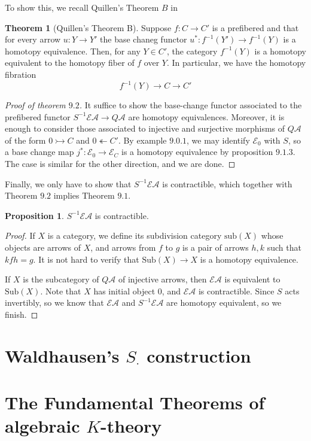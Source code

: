 \documentclass{article}
\theoremstyle{definition}
\newtheorem{theorem}{Theorem}[section]
\theoremstyle{definition}
\theoremstyle{definition}
\theoremstyle{definition}
\newtheorem{proposition}{Proposition}[theorem]
\theoremstyle{definition}
\theoremstyle{definition}
\theoremstyle{definition}
\begin{document}
To show this, we recall Quillen's Theorem $B$ in \cite{Quillen}


\begin{tcolorbox}[colback=red!5!white,colframe=red!30!white]
\begin{theorem}[Quillen's Theorem B]
Suppose $f: C\to C'$ is a prefibered and that for every arrow $u: Y\to Y'$ the base chaneg functor $u^*: f^{-1}(Y')\to f^{-1}(Y)$ is a homotopy equivalence. Then, for any $Y\in C'$, the category $f^{-1}(Y)$ is a homotopy equivalent to the homotopy fiber of $f$ over $Y$. In particular, we have the homotopy fibration
\[f^{-1}(Y)\to C\to C'\]
\end{theorem}
\end{tcolorbox}
\begin{proof}[Proof of theorem $9.2$]
    It suffice to show the base-change functor associated to the prefibered functor $S^{-1}\mathcal{E}\mathcal{A}\to Q \mathcal{A}$ are homotopy equivalences. Moreover, it is enough to consider those associated to injective and surjective morphisms of $Q \mathcal{A}$ of the form $0\rightarrowtail C$ and $0\twoheadleftarrow C'$. By example $9.0.1$, we may identify $\mathcal{E}_0$ with $S$, so a base change map $j^*: \mathcal{E}_0\to \mathcal{E}_C$ is a homotopy equivalence by proposition $9.1.3$. The case is similar for the other direction, and we are done.
\end{proof}

Finally, we only have to show that $S^{-1}\mathcal{E}\mathcal{A}$ is contractible, which together with Theorem $9.2$ implies Theorem $9.1$. 


\begin{tcolorbox}[colback=blue!5!white,colframe=blue!30!white]
\begin{proposition}
$S^{-1}\mathcal{E}\mathcal{A}$ is contractible.
\end{proposition}
\end{tcolorbox}
\begin{proof}
    If $X$ is a category, we define its subdivision category $\textrm{sub}(X)$ whose objects are arrows of $X$, and arrows from $f$ to  $g$ is a pair of arrows $h,k$ such that $kfh=g$. It is not hard to verify that $\textrm{Sub}(X)\to X$ is a homotopy equivalence. 

    If $X$ is the subcategory of $Q \mathcal{A}$ of injective arrows, then $\mathcal{E}\mathcal{A}$ is equivalent to $\textrm{Sub} (X)$. Note that $X$ has initial object $0$, and $\mathcal{E}\mathcal{A}$ is contractible. Since $S$ acts invertibly, so we know that $\mathcal{E} \mathcal{A}$ and $S^{-1}\mathcal{E} \mathcal{A}$ are homotopy equivalent, so we finish.
\end{proof}


\section{Waldhausen's $S_{\cdot}$ construction}


\section{The Fundamental Theorems of algebraic $K$-theory}
















\printbibliography
\end{document}
